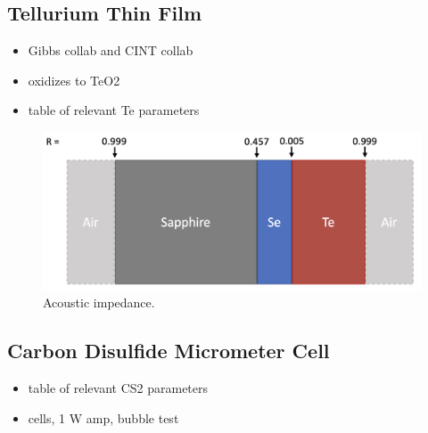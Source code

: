 \subsection{Tellurium Thin Film}
\label{subsec:Raman:Target:Te}

\begin{itemize}
  \item Gibbs collab and CINT collab
  \item oxidizes to TeO2
  \item table of relevant Te parameters
\end{itemize}

\begin{figure}[t]
  \centering
  \includegraphics[width=.8\textwidth]{figs/4-Raman/AcousticImpedance.png}
  \caption{Acoustic impedance.}
  \label{fig:Raman:AcousticImpedance}
\end{figure}

\subsection{Carbon Disulfide Micrometer Cell}
\label{subsec:Raman:Target:CS2Cells}

\begin{itemize}
  \item table of relevant CS2 parameters
  \item cells, 1 W amp, bubble test
\end{itemize}

